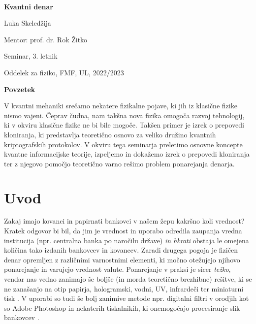 \documentclass[12pt]{article}
\begin{document}
 $~$ 
 
 \vspace{2cm}
 
 \centerline{\bf \huge   Kvantni denar}
 
 \vspace{1cm}
 
  \centerline{\huge  Luka Skeledžija}
  
   \vspace{1cm}
  
  \centerline{\large Mentor: prof. dr. Rok Žitko}
  
  \vspace{1cm}
  
  \centerline{\large Seminar, 3. letnik}
  
  \vspace{1cm}
  
  \centerline{\large Oddelek za fiziko, FMF, UL, 2022/2023}
  
  \vspace{6cm}
  
  \begin{minipage}[c]{0.9\hsize}
  {\bf Povzetek}
  
  V kvantni mehaniki srečamo nekatere fizikalne pojave, ki jih iz klasične fizike nismo vajeni. Čeprav čudna, nam takšna nova fizika omogoča razvoj tehnologij, ki v okviru klasične fizike ne bi bile mogoče. Takšen primer je izrek o prepovedi kloniranja, ki predstavlja teoretično osnovo za veliko družino kvantnih kriptografskih protokolov. V okviru tega seminarja preletimo osnovne koncepte kvantne informacijske teorije, izpeljemo in dokažemo izrek o prepovedi kloniranja ter z njegovo pomočjo teoretično varno rešimo problem ponarejanja denarja. 
    \end{minipage}

 
 \newpage
 
 \tableofcontents

 \newpage
  
  
 \section{Uvod}
	Zakaj imajo kovanci in papirnati bankovci v našem žepu kakršno koli vrednost? Kratek odgovor bi bil, da jim je vrednost in uporabo odredila zaupanja vredna institucija (npr. centralna banka po naročilu države) \emph{in hkrati} obstaja le omejena količina tako izdanih bankovcev in kovancev. Zaradi drugega pogoja je fizičen denar opremljen z različnimi varnostnimi elementi, ki močno otežujejo njihovo ponarejanje in varujejo vrednost valute. Ponarejanje v praksi je sicer \emph{težko}, vendar nas vedno zanimajo še boljše (in morda teoretično brezhibne) rešitve, ki se ne zanašanjo na otip papirja, hologramski, vodni, UV, infrardeči ter miniaturni tisk \cite{bankSecurityFeatures2018}.  V uporabi so tudi še bolj zanimive metode npr. digitalni filtri v orodjih kot so Adobe Photoshop in nekaterih tiskalnikih, ki onemogočajo procesiranje slik bankovcev \cite{SoftwareDetectionCurrency}. 
\end{document}
